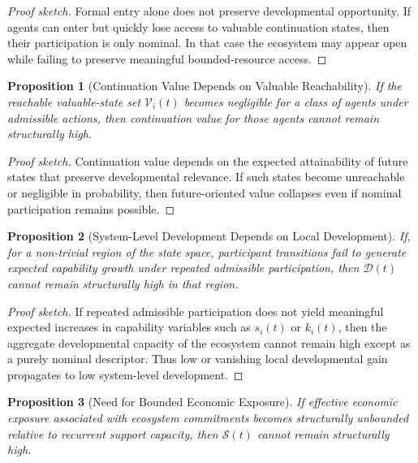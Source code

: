 \documentclass[11pt]{article}
\newtheorem{proposition}{Proposition}
\begin{document}
\begin{proof}[Proof sketch]
Formal entry alone does not preserve developmental opportunity. If agents can enter but quickly lose access to valuable continuation states, then their participation is only nominal. In that case the ecosystem may appear open while failing to preserve meaningful bounded-resource access.
\end{proof}

\begin{proposition}[Continuation Value Depends on Valuable Reachability]
If the reachable valuable-state set \(\mathcal{V}_i(t)\) becomes negligible for a class of agents under admissible actions, then continuation value for those agents cannot remain structurally high.
\end{proposition}

\begin{proof}[Proof sketch]
Continuation value depends on the expected attainability of future states that preserve developmental relevance. If such states become unreachable or negligible in probability, then future-oriented value collapses even if nominal participation remains possible.
\end{proof}

\begin{proposition}[System-Level Development Depends on Local Development]
If, for a non-trivial region of the state space, participant transitions fail to generate expected capability growth under repeated admissible participation, then \(\mathcal{D}(t)\) cannot remain structurally high in that region.
\end{proposition}

\begin{proof}[Proof sketch]
If repeated admissible participation does not yield meaningful expected increases in capability variables such as \(s_i(t)\) or \(k_i(t)\), then the aggregate developmental capacity of the ecosystem cannot remain high except as a purely nominal descriptor. Thus low or vanishing local developmental gain propagates to low system-level development.
\end{proof}

\begin{proposition}[Need for Bounded Economic Exposure]
If effective economic exposure associated with ecosystem commitments becomes structurally unbounded relative to recurrent support capacity, then \(\mathcal{S}(t)\) cannot remain structurally high.
\end{proposition}
\end{document}
